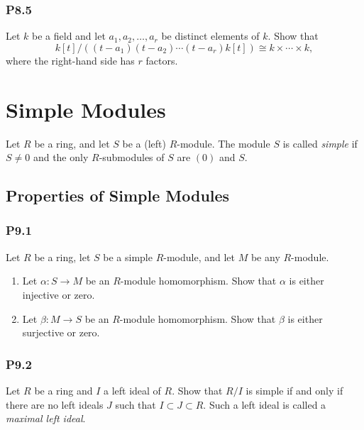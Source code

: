 \documentclass[lang=cn,11pt]{template}
\begin{document}
\subsection*{P8.5} Let \( k \) be a field and let \( a_1, a_2, \ldots, a_r \) be distinct elements of \( k \). Show that
\[
k[t]/((t - a_1)(t - a_2) \cdots (t - a_r)k[t]) \cong k \times \cdots \times k,
\]
where the right-hand side has \( r \) factors.










\chapter{Simple Modules}

\begin{definition}
Let \( R \) be a ring, and let \( S \) be a (left) \( R \)-module. The module \( S \) is called \textit{simple} if \( S \neq 0 \) and the only \( R \)-submodules of \( S \) are \( (0) \) and \( S \).
\end{definition}

\section{Properties of Simple Modules}

\subsection*{P9.1} Let \( R \) be a ring, let \( S \) be a simple \( R \)-module, and let \( M \) be any \( R \)-module.
\begin{enumerate}
    \item Let \( \alpha : S \to M \) be an \( R \)-module homomorphism. Show that \( \alpha \) is either injective or zero.
    \item Let \( \beta : M \to S \) be an \( R \)-module homomorphism. Show that \( \beta \) is either surjective or zero.
\end{enumerate}

\subsection*{P9.2} Let \( R \) be a ring and \( I \) a left ideal of \( R \). Show that \( R/I \) is simple if and only if there are no left ideals \( J \) such that \( I \subset J \subset R \). Such a left ideal is called a \textit{maximal left ideal}.
\end{document}
